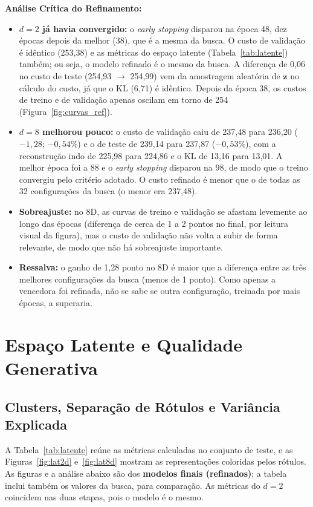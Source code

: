 \documentclass[11pt,a4paper]{article}
\begin{document}
\textbf{Análise Crítica do Refinamento:}
\begin{itemize}
    \item \textbf{$d=2$ já havia convergido:} o \textit{early stopping} disparou na época 48, dez épocas depois da melhor (38), que é a mesma da busca. O custo de validação é idêntico (253,38) e as métricas do espaço latente (Tabela~\ref{tab:latente}) também; ou seja, o modelo refinado é o mesmo da busca. A diferença de 0,06 no custo de teste (254,93 $\to$ 254,99) vem da amostragem aleatória de $\mathbf{z}$ no cálculo do custo, já que o KL (6,71) é idêntico. Depois da época 38, os custos de treino e de validação apenas oscilam em torno de 254 (Figura~\ref{fig:curvas_ref}).
    \item \textbf{$d=8$ melhorou pouco:} o custo de validação caiu de 237,48 para 236,20 ($-1{,}28$; $-0{,}54\%$) e o de teste de 239,14 para 237,87 ($-0{,}53\%$), com a reconstrução indo de 225,98 para 224,86 e o KL de 13,16 para 13,01. A melhor época foi a 88 e o \textit{early stopping} disparou na 98, de modo que o treino convergiu pelo critério adotado. O custo refinado é menor que o de todas as 32 configurações da busca (o menor era 237,48).
    \item \textbf{Sobreajuste:} no 8D, as curvas de treino e validação se afastam levemente ao longo das épocas (diferença de cerca de 1 a 2 pontos no final, por leitura visual da figura), mas o custo de validação não volta a subir de forma relevante, de modo que não há sobreajuste importante.
    \item \textbf{Ressalva:} o ganho de 1,28 ponto no 8D é maior que a diferença entre as três melhores configurações da busca (menos de 1 ponto). Como apenas a vencedora foi refinada, não se sabe se outra configuração, treinada por mais épocas, a superaria.
\end{itemize}

\section{Espaço Latente e Qualidade Generativa}

\subsection{Clusters, Separação de Rótulos e Variância Explicada}

A Tabela~\ref{tab:latente} reúne as métricas calculadas no conjunto de teste, e as Figuras~\ref{fig:lat2d} e~\ref{fig:lat8d} mostram as representações coloridas pelos rótulos. As figuras e a análise abaixo são dos \textbf{modelos finais (refinados)}; a tabela inclui também os valores da busca, para comparação. As métricas do $d=2$ coincidem nas duas etapas, pois o modelo é o mesmo.
\end{document}
